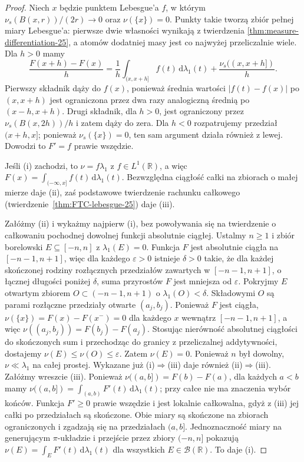 \begin{proof}
Niech $x$ będzie punktem Lebesgue'a $f$, w którym
$\nu_s(B(x,r))/(2r)\to0$ oraz $\nu(\{x\})=0$.
Punkty takie tworzą zbiór pełnej miary Lebesgue'a:
pierwsze dwie własności wynikają z twierdzenia
\ref{thm:measure-differentiation-25}, a atomów dodatniej
masy jest co najwyżej przeliczalnie wiele.
Dla $h>0$ mamy
\[
 \frac{F(x+h)-F(x)}h
 =\frac1h\int_{(x,x+h]}f(t)\,\mathrm d\lambda_1(t)
 +\frac{\nu_s((x,x+h])}h.
\]
Pierwszy składnik dąży do $f(x)$, ponieważ średnia
wartości $|f(t)-f(x)|$ po $(x,x+h)$ jest ograniczona
przez dwa razy analogiczną średnią po $(x-h,x+h)$.
Drugi składnik, dla $h>0$, jest ograniczony przez
$\nu_s(B(x,2h))/h$ i zatem dąży do zera.
Dla $h<0$ rozpatrujemy przedział $(x+h,x]$;
ponieważ $\nu_s(\{x\})=0$, ten sam argument działa
również z lewej. Dowodzi to $F'=f$ prawie wszędzie.

Jeśli (i) zachodzi, to $\nu=f\lambda_1$ z
$f\in L^1(\mathbb R)$, a więc
$F(x)=\int_{(-\infty,x]}f(t)\,\mathrm d\lambda_1(t)$.
Bezwzględna ciągłość całki na zbiorach o małej mierze
daje (ii), zaś podstawowe twierdzenie rachunku
całkowego (twierdzenie~\ref{thm:FTC-lebesgue-25})
daje (iii).

Załóżmy (ii) i wykażmy najpierw (i), bez powoływania
się na twierdzenie o całkowaniu pochodnej dowolnej funkcji
absolutnie ciągłej. Ustalmy $n\ge1$ i zbiór borelowski
$E\subseteq[-n,n]$ z $\lambda_1(E)=0$. Funkcja $F$
jest absolutnie ciągła na $[-n-1,n+1]$, więc dla
każdego $\varepsilon>0$ istnieje $\delta>0$ takie,
że dla każdej skończonej rodziny rozłącznych przedziałów
zawartych w $[-n-1,n+1]$, o łącznej długości poniżej
$\delta$, suma przyrostów $F$ jest mniejsza od
$\varepsilon$. Pokryjmy $E$ otwartym zbiorem
$O\subset(-n-1,n+1)$ o $\lambda_1(O)<\delta$.
Składowymi $O$ są parami rozłączne przedziały otwarte
$(a_j,b_j)$. Ponieważ $F$ jest ciągła,
$\nu(\{x\})=F(x)-F(x^-)=0$ dla każdego $x$
wewnątrz $[-n-1,n+1]$, a więc
$\nu((a_j,b_j))=F(b_j)-F(a_j)$.
Stosując nierówność absolutnej ciągłości do skończonych
sum i przechodząc do granicy z przeliczalnej addytywności,
dostajemy $\nu(E)\le\nu(O)\le\varepsilon$.
Zatem $\nu(E)=0$. Ponieważ $n$ był dowolny,
$\nu\ll\lambda_1$ na całej prostej. Wykazane już
(i)$\Rightarrow$(iii) daje również (ii)$\Rightarrow$(iii).
Załóżmy wreszcie (iii). Ponieważ
$\nu((a,b])=F(b)-F(a)$, dla każdych $a<b$ mamy
$\nu((a,b])=\int_{(a,b)}F'(t)\,\mathrm d\lambda_1(t)$;
przy całce nie ma znaczenia wybór końców.
Funkcja $F'\ge0$ prawie wszędzie i jest lokalnie
całkowalna, gdyż z (iii) jej całki po przedziałach
są skończone. Obie miary są skończone na zbiorach
ograniczonych i zgadzają się na przedziałach $(a,b]$.
Jednoznaczność miary na generującym $\pi$-układzie
i przejście przez zbiory $(-n,n]$ pokazują
$\nu(E)=\int_EF'(t)\,\mathrm d\lambda_1(t)$
dla wszystkich $E\in\mathcal B(\mathbb R)$.
To daje (i).
\end{proof}

